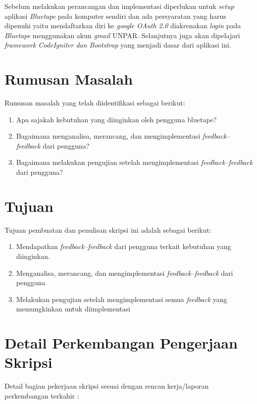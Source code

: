 \documentclass[a4paper,twoside]{article}
\begin{document}
Sebelum melakukan perancangan dan implementasi diperlukan untuk \textit{setup} aplikasi \textit{Bluetape} pada komputer sendiri dan ada persyaratan yang harus dipenuhi yaitu mendaftarkan diri ke \textit{google OAuth 2.0} diakrenakan \textit{login} pada \textit{Bluetape} menggunakan akun \textit{gmail} UNPAR. Selanjutnya juga akan dipelajari \textit{framework CodeIgniter dan Bootstrap} yang menjadi dasar dari aplikasi ini.

\section{Rumusan Masalah}

Rumusan masalah yang telah diidentifikasi sebagai berikut:
\begin{enumerate}
	\item Apa sajakah kebutuhan yang diinginkan oleh pengguna bluetape?
	\item Bagaimana menganalisa, merancang, dan mengimplementasi \textit{feedback--feedback} dari pengguna?
	\item Bagaimana melakukan pengujian setelah mengimplementasi \textit{feedback--feedback} dari pengguna?
	
\end{enumerate}

\section{Tujuan}

Tujuan pembuatan dan penulisan skripsi ini adalah sebagai berikut:
\begin{enumerate}
	\item Mendapatkan \textit{feedback--feedback} dari pengguna terkait kebutuhan yang diinginkan.
	\item Menganalisa, merancang, dan mengimplementasi \textit{feedback--feedback} dari pengguna
	\item Melakukan pengujian setelah mengimplementasi semua \textit{feedback} yang memungkinkan untuk diimplementasi
	
\end{enumerate}

\section{Detail Perkembangan Pengerjaan Skripsi}
Detail bagian pekerjaan skripsi sesuai dengan rencan kerja/laporan perkembangan terkahir :
\end{document}
